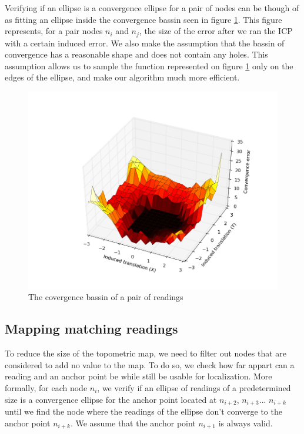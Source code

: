 \documentclass[letterpaper,10 pt,conference]{ieeeconf}
\begin{document}
Verifying if an ellipse is a convergence ellipse for a pair of nodes can be though of as fitting an
ellipse inside the convergence bassin seen in figure \ref{convergence_bassin}. This figure
represents, for a pair nodes $n_i$ and $n_j$, the size of the error after we ran the ICP with a
certain induced error. We also make the assumption that the bassin of convergence has a reasonable
shape and does not contain any holes. This assumption allows us to sample the function represented
on figure \ref{convergence_bassin} only on the edges of the ellipse, and make our algorithm much
more efficient.

\begin{figure}[thpb]
  \centering
  \includegraphics[scale=0.4]{convergence_bassin}
  \caption{The covergence bassin of a pair of readings}
  \label{convergence_bassin}
\end{figure}

\subsection{Mapping matching readings}
\label{matching-readings}
To reduce the size of the topometric map, we need to filter out nodes that are considered to add no
value to the map. To do so, we check how far appart can a reading and an anchor point be while still
be usable for localization. More formally, for each node $n_i$, we verify if an ellipse of readings
of a predetermined size is a convergence ellipse for the anchor point located at $n_{i+2}$,
$n_{i+3}$... $n_{i+k}$ until we find the node where the readings of the ellipse don't converge to
the anchor point $n_{i+k}$. We assume that the anchor point $n_{i+1}$ is always valid.
\end{document}
